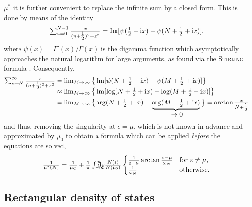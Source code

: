 $\mu^*$ it is further convenient to replace the infinite sum by a closed form.
This is done by means of the identity \cite[Eq.~A.14]{AllenMitrovic82}
%
\begin{equation*}
    \sum_{n = 0}^{N - 1} \frac x {(n + \tfrac 1 2)^2 + x^2}
    = \Im[\psi(\tfrac 1 2 + \I x) - \psi(N + \tfrac 1 2 + \I x)],
\end{equation*}
%
where $\psi(x) = \varGamma'(x) / \varGamma(x)$ is the digamma function which
asymptotically approaches the natural logarithm for large arguments, as found
via the \textsc{Stirling} formula \cite[Appendix~A]{AllenMitrovic82}.
Consequently,
%
\begin{align*}
    \smash[b]{\sum_{n = N}^\infty \frac x {(n + \tfrac 1 2)^2 + x^2}}
    &= \lim_{M \rightarrow \infty}
    \big\{
        \Im[\psi(N + \tfrac 1 2 + \I x) - \psi(M + \tfrac 1 2 + \I x)]
    \big\}
    \\
    &\approx \lim_{M \rightarrow \infty}
    \big\{
        \Im[\log(N + \tfrac 1 2 + \I x) - \log(M + \tfrac 1 2 + \I x)]
    \big\}
    \\
    &= \lim_{M \rightarrow \infty}
    \big\{
        \arg(N + \tfrac 1 2 + \I x)
        - \hypo{\arg(M + \tfrac 1 2 + \I x)}{\rightarrow 0}
    \big\}
    = \smash{\arctan \frac x {N + \tfrac 1 2}}
\end{align*}
%
and thus, removing the singularity at $\epsilon = \mu$, which is not known in
advance and approximated by $\mu_0$ to obtain a formula which can be applied
\emph{before} the  equations are solved,
%
\begin{equation} \label{rescaled Coulomb pseudo-potential}
    \frac 1 {\mu^*(N)} = \frac 1 {\mu \sub C}
    + \frac 1 \pi \int \from{-\infty} \till \infty \D \epsilon
    \frac{N(\epsilon)}{N(\mu_0)}
    \begin{cases}
        \frac 1 {\epsilon - \mu} \arctan \frac{\epsilon - \mu}{\omega_N}
            & \text{for $\epsilon \neq \mu$,} \\
        \frac 1 {\omega_N}
            & \text{otherwise.}
    \end{cases}
\end{equation}

\subsection{Rectangular density of states}
\label{rectangular density of states}

